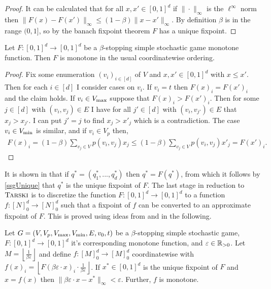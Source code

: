 \begin{proof}
  It can be calculated that for all $x, x' \in [0, 1]^d$ if $\|\cdot \|_\infty$ is the $\ell^\infty$ norm then
  $\|F(x) - F(x')\|_\infty \leq (1 - \beta)\|x - x'\|_{\infty}$. By definition $\beta$ is in the range $(0, 1]$, so 
  by the banach fixpoint theorem $F$ has a unique
  fixpoint.
\end{proof}
\begin{lemma}
  Let $F : [0, 1]^d \to [0, 1]^d$ be a $\beta$-stopping simple stochastic game monotone function. 
  Then $F$ is monotone in the usual coordinatewise ordering.
\end{lemma}
\begin{proof}
  Fix some enumeration $(v_i)_{i \in [d]}$ of $V$ and $x, x' \in [0, 1]^d$ with $x \leq x'$.
  Then for each $i \in [d]$ I consider cases on $v_i$. If $v_i = t$ then $F(x)_i = F(x')_i$ and
  the claim holds. If $v_i \in V_{\max}$ suppose that $F(x)_i > F(x')_i$. 
  Then for some $j \in [d]$ with $(v_i, v_j) \in E$ I have for all $j' \in [d]$
  with $(v_i, v_{j'}) \in E$ that $x_j > x_{j'}$. I can put $j' = j$ to find $x_j > x'_{j}$ which is a contradiction.
  The case $v_i \in V_{\min}$ is similar, and if $v_i \in V_p$ then,
  \begin{align*}
    F(x)_i = (1 - \beta) \sum_{v_j \in V} p(v_i, v_j) x_j \leq (1 - \beta) \sum_{v_j \in V} p(v_i, v_j) x'_j = F(x')_i.
  \end{align*}
\end{proof}
It is shown in \citep{condon} that if $q^* = (q_1^*, ..., q_d^*)$ then $q^* = F(q^*)$, from which it follows
by \cref{ssgUnique} that $q^*$ is the unique fixpoint of $F$. The last stage in reduction to $\textsc{Tarski}$
is to discretize the function $F : [0, 1]^d \to [0, 1]^d$ to a function $f : [N]_0^d \to [N]_0^d$
such that a fixpoint of $f$ can be converted to an approximate fixpoint of $F$.
This is proved using ideas from \citep{nashComp} and \citep{lowerBound} in the following.
\begin{lemma}
 Let $G = (V, V_p, V_{\max}, V_{\min}, E, v_0, t)$ be a $\beta$-stopping simple 
  stochastic game,
  $F : [0, 1]^d \to [0, 1]^d$ it's corresponding monotone function, and 
  $\varepsilon \in \mathbb{R}_{> 0}$.
  Let $M = \left \lfloor \frac{1}{\beta \varepsilon}\right \rfloor$
  and define 
  $f : [M]_0^d \to [M]_0^d$ coordinatewise with 
  $f(x)_i = \left \lfloor F(\beta \varepsilon \cdot x)_i \cdot 
    \frac{1}{\beta \varepsilon}\right \rfloor$.
    If $x^* \in [0, 1]^d$ is the unique fixpoint of $F$
    and $x = f(x)$ then $\|\beta \varepsilon \cdot x - x^*\|_\infty < \varepsilon$.
    Further, $f$ is monotone.
\end{lemma}
